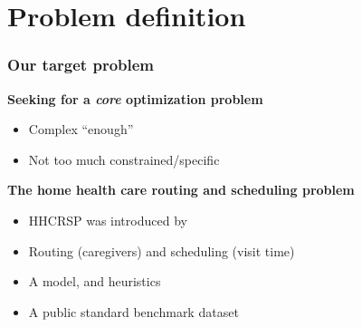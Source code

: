 \section{Problem definition}

\begin{frame}[plain]
   \sectionpage
\end{frame}

\begin{frame}
   \frametitle{Our target problem}

   \textbf{Seeking for a \emph{core} optimization problem}
   \begin{itemize}
      \item Complex ``enough''
      \item Not too much constrained/specific
   \end{itemize}

   \vspace*{12pt}

   \textbf{The home health care routing and scheduling problem}
   \begin{itemize}
      \item HHCRSP was introduced by \citet{mankowska2014}
      \item Routing (caregivers) and scheduling (visit time)
      \item A model, and heuristics
      \item A public standard benchmark dataset
   \end{itemize}



\end{frame}



